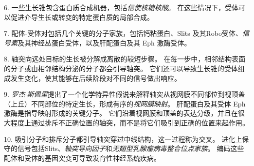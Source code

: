 6. 一些生长锥包含蛋白质合成机器，包括\textit{信使核糖核酸}。
在这些情况下，受体可以促进介导生长或转变的特定蛋白质的局部合成。


7. 配体-受体对包括几个关键的分子家族，包括钙粘蛋白、Slits 及其Robo受体、\textit{信号素}及其神经丛蛋白受体，以及肝配蛋白及其 Eph 激酶受体。


8. 轴突向远处目标的生长被分解成离散的较短步骤。 
在每一步中，相邻结构表面的分子或由相邻结构分泌的分子都会引导轴突。
它们还可以导致生长锥的受体组成发生变化，使其能够在后续阶段对不同的信号做出响应。


9. \textit{罗杰$\cdot$斯佩里}提出了一个化学特异性假说来解释轴突从视网膜不同部位到视顶盖（上丘）不同部位的特定生长，形成有序的\textit{视网膜映射}。
肝配蛋白及其受体 Eph 激酶是指导映射形成的关键分子。
它们沿着视网膜和顶盖的表达分级，并且在很大程度上通过排斥不正确位置的轴突，而不是将它们吸引到正确的位置来起作用。


10. 吸引分子和排斥分子都引导轴突穿过中线结构，这一过程称为交叉。
进化上保守的信号包括Slits、\textit{轴突导向因子}和\textit{无翅型乳腺瘤病毒整合位点家族}。
编码这些配体和受体的基因突变可导致发育性神经系统疾病。

